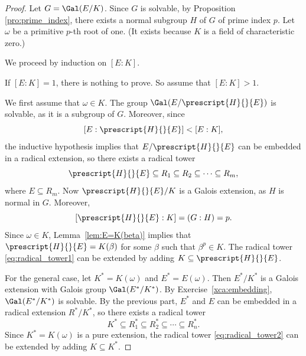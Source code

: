 \begin{proof}
    Let $G=\Gal(E/K)$. Since $G$ is solvable, by Proposition \ref{pro:prime_index}, 
    there exists a normal subgroup $H$ of $G$ of prime index $p$. 
    Let $\omega$ be a primitive $p$-th root of one. (It exists because $K$ is a field of characteristic zero.)
    
    We proceed by induction on $[E:K]$. 
    
    If $[E:K]=1$, there is nothing to prove. 
    So assume that $[E:K]>1$. 

    We first assume that $\omega\in K$. 
    The group $\Gal(E/\prescript{H}{}{E})$ is solvable, as it is a subgroup of $G$. Moreover, since 
    \[
    [E:\prescript{H}{}{E}]<[E:K],
    \]
    the inductive hypothesis implies that $E/\prescript{H}{}{E}$ can be embedded in a radical extension, so 
    there exists a radical tower
    \begin{equation}
    \label{eq:radical_tower1}
    \prescript{H}{}{E}\subseteq R_1\subseteq R_2\subseteq\cdots\subseteq R_m,
    \end{equation}
    where $E\subseteq R_m$. Now $\prescript{H}{}{E}/K$ is a Galois extension, as $H$ is normal in $G$. Moreover, 
    \[ 
    [\prescript{H}{}{E}:K]=(G:H)=p.
    \]
    Since $\omega\in K$, Lemma~\ref{lem:E=K(beta)} implies that 
    $\prescript{H}{}{E}=K(\beta)$ for some $\beta$ such that $\beta^p\in K$. The radical tower \ref{eq:radical_tower1} can be 
    extended by adding $K\subseteq \prescript{H}{}{E}$. 

    For the general case, let $K^*=K(\omega)$ and $E^*=E(\omega)$. Then $E^*/K^*$ is a Galois extension with Galois group 
    $\Gal(E^*/K^*)$. By Exercise~\ref{xca:embedding}, $\Gal(E^*/K^*)$ is solvable. By the previous part, 
    $E^*$ and $E$ can be embedded in a radical extension $R^*/K^*$, so there exists a radical tower
    \begin{equation}
    \label{eq:radical_tower2}
    K^*\subseteq R_1^*\subseteq R_2^*\subseteq\cdots\subseteq R_n^*.
    \end{equation}
    Since $K^*=K(\omega)$ is a pure extension, the radical tower \eqref{eq:radical_tower2} 
    can be extended by adding $K\subseteq K^*$. 
\end{proof}